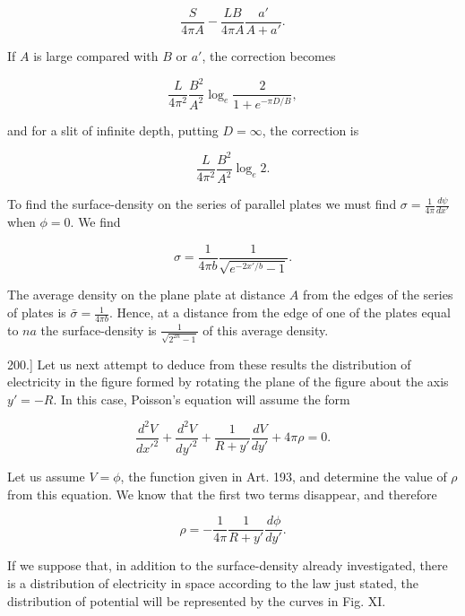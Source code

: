\documentclass[11pt,a4paper]{article}
\begin{document}
\begin{equation}\tag{29}
\frac{S}{4\pi A}-\frac{LB}{4\pi A}\frac{a'}{A+a'}.
\end{equation}

If $A$ is large compared with $B$ or $a'$, the correction becomes

\begin{equation}\tag{30}
\frac{L}{4\pi^2}\frac{B^2}{A^2}\log_e\frac{2}{1+e^{-\pi D/B}},
\end{equation}

and for a slit of infinite depth, putting $D=\infty$, the correction is

\begin{equation}\tag{31}
\frac{L}{4\pi^2}\frac{B^2}{A^2}\log_e 2.
\end{equation}

To find the surface-density on the series of parallel plates we must
find $\sigma=\frac{1}{4\pi}\frac{d\psi}{dx'}$ when $\phi=0$. We find

\begin{equation}\tag{32}
\sigma=\frac{1}{4\pi b}\frac{1}{\sqrt{e^{-2x'/b}-1}}.
\end{equation}

The average density on the plane plate at distance $A$ from the edges
of the series of plates is $\bar{\sigma}=\frac{1}{4\pi b}$. Hence, at a
distance from the edge of one of the plates equal to $na$ the
surface-density is $\frac{1}{\sqrt{2^{2n}-1}}$ of this average density.

200.] Let us next attempt to deduce from these results the distribution
of electricity in the figure formed by rotating the plane of the figure
about the axis $y'=-R$. In this case, Poisson's equation will assume
the form

\begin{equation}\tag{33}
\frac{d^2V}{dx'^2} + \frac{d^2V}{dy'^2} + \frac{1}{R+y'}\frac{dV}{dy'} + 4\pi\rho = 0.
\end{equation}

Let us assume $V=\phi$, the function given in Art. 193, and determine
the value of $\rho$ from this equation. We know that the first two
terms disappear, and therefore

\begin{equation}\tag{34}
\rho = -\frac{1}{4\pi} \frac{1}{R + y'} \frac{d\phi}{dy'}.
\end{equation}

If we suppose that, in addition to the surface-density already
investigated, there is a distribution of electricity in space according
to the law just stated, the distribution of potential will be
represented by the curves in Fig. XI.
\end{document}
